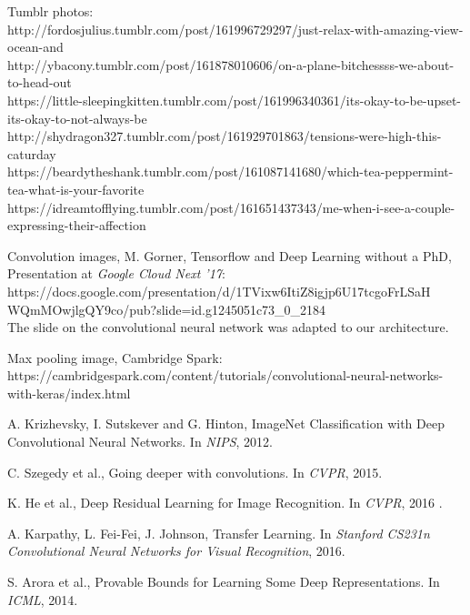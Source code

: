 \begin{thebibliography}{999}

Tumblr photos:\\
http://fordosjulius.tumblr.com/post/161996729297/just-relax-with-amazing-view-ocean-and\\
http://ybacony.tumblr.com/post/161878010606/on-a-plane-bitchessss-we-about-to-head-out\\
https://little-sleepingkitten.tumblr.com/post/161996340361/its-okay-to-be-upset-its-okay-to-not-always-be\\
http://shydragon327.tumblr.com/post/161929701863/tensions-were-high-this-caturday\\
https://beardytheshank.tumblr.com/post/161087141680/which-tea-peppermint-tea-what-is-your-favorite\\
https://idreamtofflying.tumblr.com/post/161651437343/me-when-i-see-a-couple-expressing-their-affection

Convolution images, M. Gorner, Tensorflow and Deep Learning without a PhD, Presentation at \textit{Google Cloud Next '17}:\\ 
https://docs.google.com/presentation/d/1TVixw6ItiZ8igjp6U17tcgoFrLSaH\\WQmMOwjlgQY9co/pub?slide=id.g1245051c73\_0\_2184\\
The slide on the convolutional neural network was adapted to our architecture.

Max pooling image, Cambridge Spark:\\
https://cambridgespark.com/content/tutorials/convolutional-neural-networks-with-keras/index.html

A. Krizhevsky, I. Sutskever and G. Hinton, ImageNet Classification with Deep Convolutional
Neural Networks. In \textit{NIPS}, 2012.

C. Szegedy et al., Going deeper with convolutions. In \textit{CVPR}, 2015.

K. He et al., Deep Residual Learning for Image Recognition. In \textit{CVPR}, 2016 .

A. Karpathy, L. Fei-Fei, J. Johnson, Transfer Learning. In \textit{Stanford CS231n Convolutional Neural Networks for Visual Recognition}, 2016.

S. Arora et al., Provable Bounds for Learning Some Deep Representations. In \textit{ICML}, 2014. 


\end{thebibliography}
